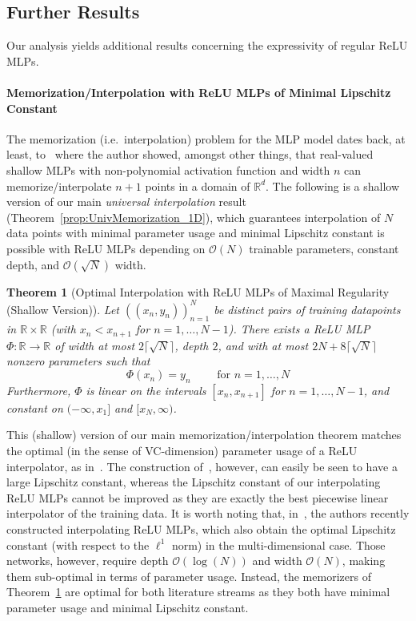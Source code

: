 \documentclass{article}
\numberwithin{equation}{section}
\newtheorem{theorem}{Theorem}[section]
\theoremstyle{definition}
\begin{document}
\subsection{Further Results}
\label{s:Intro__ss:FurtherResults}

Our analysis yields additional results concerning the expressivity of regular ReLU MLPs.
\paragraph{Memorization/Interpolation with ReLU MLPs of Minimal Lipschitz Constant}
The memorization (i.e.\ interpolation) problem for the MLP model dates back, at least, to~\citep[Theorem 5.1]{Pinkus_MLPApproximation_ActaNumerica_1999} where the author showed, amongst other things, that real-valued shallow MLPs with non-polynomial activation function and width $n$ can memorize/interpolate $n+1$ points in a domain of $\mathbb{R}^d$. 
The following is a shallow version of our main \textit{universal interpolation} result (Theorem~\ref{prop:UnivMemorization_1D}), which guarantees interpolation of $N$ data points with minimal parameter usage and minimal Lipschitz constant is possible with ReLU MLPs depending on $\mathcal{O}(N)$ trainable parameters, constant depth, and $\mathcal{O}(\sqrt{N})$ width.
  
\begin{theorem}[Optimal Interpolation with ReLU MLPs of Maximal Regularity (Shallow Version)]
\label{thrm:min_size_reg_interpol}
Let $((x_n,y_n))_{n=1}^N$ be distinct pairs of training datapoints in $\mathbb{R}\times \mathbb{R}$ (with $x_n<x_{n+1}$ for $n=1,\dots,N-1$).  There exists a ReLU MLP $\Phi:\mathbb{R}\to \mathbb{R}$ of width at most $2 \lceil \sqrt{N} \rceil$, depth $2$, and with at most $2N+8\lceil \sqrt{N} \rceil$ nonzero parameters such that
\[
    \Phi(x_n) = y_n
    \qquad
    \mbox{ for }n=1,\dots,N
\]
Furthermore, $\Phi$ is linear on the intervals $[x_n,x_{n+1}]$ for $n=1,\dots,N-1$, and constant on $(-\infty,x_1]$ and $[x_N,\infty)$.
\end{theorem}
This (shallow) version of our main memorization/interpolation theorem matches the optimal (in the sense of VC-dimension) parameter usage of a ReLU interpolator, as in~\cite{vardi2021optimal}.  The construction of~\cite{vardi2021optimal}, however, can easily be seen to have a large Lipschitz constant, whereas the Lipschitz constant of our interpolating ReLU MLPs cannot be improved as they are exactly the best piecewise linear interpolator of the training data.  
It is worth noting that, in~\citep[Theorem 9.6]{petersen2024mathematical}, the authors recently constructed interpolating ReLU MLPs, which also obtain the optimal Lipschitz constant (with respect to the $\ell^1$ norm) in the multi-dimensional case.  Those networks, however, require depth $\mathcal{O}(\log(N))$ and width $\mathcal{O}(N)$, making them sub-optimal in terms of parameter usage.  Instead, the memorizers of Theorem~\ref{thrm:min_size_reg_interpol} are optimal for both literature streams as they both have minimal parameter usage and minimal Lipschitz constant. 
\end{document}
